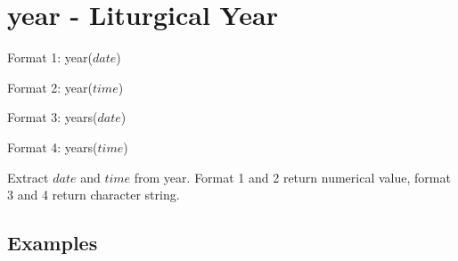 
%

\section{year - Liturgical Year \label{sect:year}}

Format 1: year($date$)

Format 2: year($time$)

Format 3: years($date$)

Format 4: years($time$)


Extract $date$ and $time$ from year. 
Format 1 and 2 return numerical value, format 3 and 4 return character string. 

\subsection*{Examples}


%

